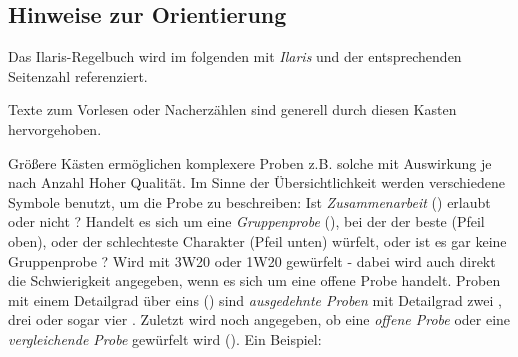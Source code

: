 \documentclass[openright]{Ilaris}
\newcommand{\vorlesen}[1]{\begin{whitebox}#1\end{whitebox}}
\begin{document}
\lizenz
\inhaltsverzeichnis
\neueseite

\spaltenanfang


\subsection*{Hinweise zur Orientierung}
Das Ilaris-Regelbuch wird im folgenden mit \emph{Ilaris} und der entsprechenden Seitenzahl referenziert.

\vorlesen{Texte zum Vorlesen oder Nacherzählen sind generell durch diesen Kasten hervorgehoben.}




\vfill


\columnbreak

Größere Kästen ermöglichen komplexere Proben z.B. solche mit Auswirkung je nach Anzahl Hoher Qualität. Im Sinne der Übersichtlichkeit werden verschiedene Symbole benutzt, um die Probe zu beschreiben:
Ist \textit{Zusammenarbeit} () erlaubt  oder nicht ?
Handelt es sich um eine \textit{Gruppenprobe} (), bei der der beste  (Pfeil oben), oder der schlechteste Charakter  (Pfeil unten) würfelt,
oder ist es gar keine Gruppenprobe ?
Wird mit 3W20  oder 1W20  gewürfelt - dabei wird auch direkt die Schwierigkeit angegeben, wenn es sich um eine offene Probe handelt.
Proben mit einem Detailgrad über eins  () sind \textit{ausgedehnte Proben} mit Detailgrad zwei , drei  oder sogar vier .
Zuletzt wird noch angegeben, ob eine \textit{offene Probe}  oder eine \textit{vergleichende Probe}  gewürfelt wird ().
Ein Beispiel:
\end{document}

